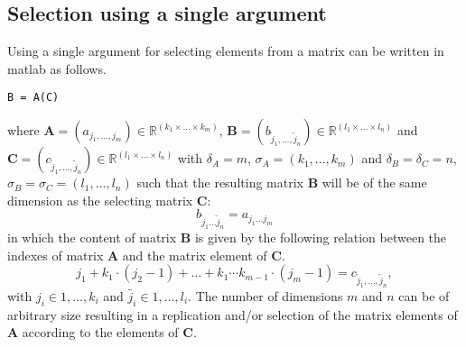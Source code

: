 \subsection{Selection using a single argument} \label{subsec:sel_single_arg}
Using a single argument for selecting elements from a matrix can be written in matlab as follows.
\begin{lstlisting}[caption={Selecting using a single argument}]
B = A(C)
\end{lstlisting}
where 
$\mathbf{A} = (a_{j_1,\dots,j_m}) \in \mathbb{R}^{(k_1 \times \dots \times k_m)}$, 
$\mathbf{B} = (b_{\tilde{j}_1,\dots,\tilde{j}_n}) \in \mathbb{R}^{(l_1 \times \dots \times l_n)}$ and
$\mathbf{C} = (c_{\tilde{j}_1,\dots,\tilde{j}_n}) \in \mathbb{R}^{(l_1 \times \dots \times l_n)}$ with 
$\delta_A = m$, $\sigma_A = (k_1,\dots,k_m)$ and $\delta_B = \delta_C = n$, $\sigma_B = \sigma_C = (l_1,\dots,l_n)$ 
such that the resulting matrix $\mathbf{B}$ will be of the same dimension as the selecting matrix $\mathbf{C}$:
\begin{equation}
\label{equ:sel1}
b_{\tilde{j}_1\dots\tilde{j}_n} = a_{j_1\dots j_m} 
\end{equation} 
in which the content of matrix $\mathbf{B}$ is given by the following relation between the indexes of matrix $\mathbf{A}$ and the matrix element of $\mathbf{C}$.
\begin{equation}\label{equ:corr_sel1}
j_1 + k_1\cdot (j_2-1) + \dots + k_1\cdots k_{m-1}\cdot (j_m-1) = c_{\tilde{j}_1,\dots,\tilde{j}_n} , 
\end{equation} 
with $j_i \in {1,\dots,k_i}$ and $\tilde{j_i} \in {1,\dots,l_i}$.
The number of dimensions $m$ and $n$ can be of arbitrary size resulting in a replication and/or selection of the matrix elements of $\mathbf{A}$ according to the elements of $\mathbf{C}$.  

